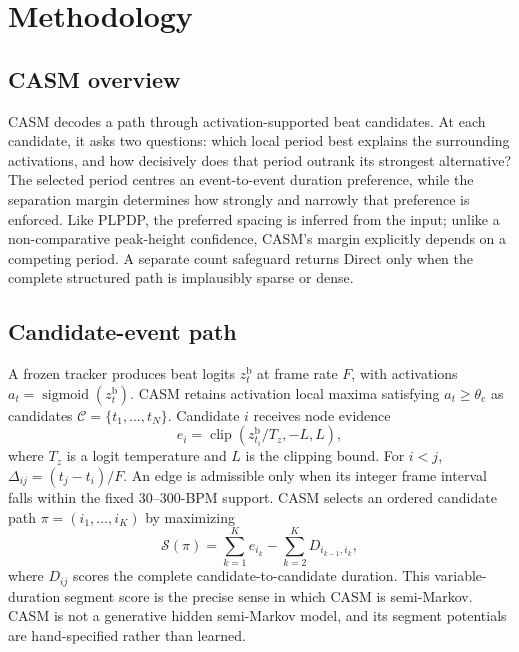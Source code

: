 \documentclass{article}
\begin{document}
\section{Methodology}
\label{sec:method}

\subsection{CASM overview}
CASM decodes a path through activation-supported beat candidates. At each candidate, it asks two questions: which local period best explains the surrounding activations, and how decisively does that period outrank its strongest alternative? The selected period centres an event-to-event duration preference, while the separation margin determines how strongly and narrowly that preference is enforced. Like PLPDP, the preferred spacing is inferred from the input; unlike a non-comparative peak-height confidence, CASM's margin explicitly depends on a competing period. A separate count safeguard returns Direct only when the complete structured path is implausibly sparse or dense.

\subsection{Candidate-event path}
A frozen tracker produces beat logits $z_t^{\mathrm b}$ at frame rate $F$, with activations $a_t=\operatorname{sigmoid}(z_t^{\mathrm b})$. CASM retains activation local maxima satisfying $a_t\geq\theta_{\mathrm c}$ as candidates $\mathcal C=\{t_1,\ldots,t_N\}$. Candidate $i$ receives node evidence
\begin{equation}
e_i=\operatorname{clip}\!\left(z_{t_i}^{\mathrm b}/T_z,-L,L\right),
\label{eq:casm-evidence}
\end{equation}
where $T_z$ is a logit temperature and $L$ is the clipping bound. For $i<j$, $\Delta_{ij}=(t_j-t_i)/F$. An edge is admissible only when its integer frame interval falls within the fixed 30--300-BPM support. CASM selects an ordered candidate path $\pi=(i_1,\ldots,i_K)$ by maximizing
\begin{equation}
\mathcal S(\pi)=\sum_{k=1}^{K}e_{i_k}
-\sum_{k=2}^{K}D_{i_{k-1},i_k},
\label{eq:casm-objective}
\end{equation}
where $D_{ij}$ scores the complete candidate-to-candidate duration. This variable-duration segment score is the precise sense in which CASM is semi-Markov. CASM is not a generative hidden semi-Markov model, and its segment potentials are hand-specified rather than learned.
\end{document}
